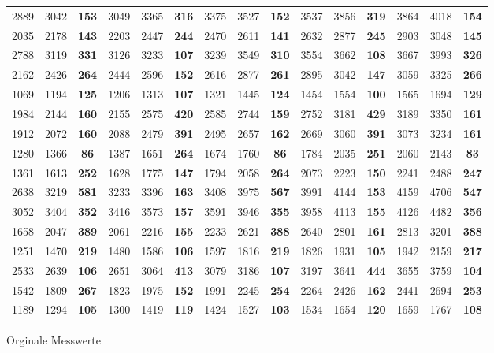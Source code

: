 \documentclass{scrartcl}
\begin{document}
\begin{figure}[H]
{\begin{tabular}{c| c| >{\bfseries}c| c| c| >{\bfseries}c| c| c| >{\bfseries}c| c| c| >{\bfseries}c| c| c| >{\bfseries}c}
                                2889 & 3042 & 153 & 3049 & 3365 & 316 & 3375 & 3527 & 152 & 3537 & 3856 & 319 & 3864 & 4018 & 154\\
                                \rowcolor{lightgray} 2035 & 2178 & 143 & 2203 & 2447 & 244 & 2470 & 2611 & 141 & 2632 & 2877 & 245 & 2903 & 3048 & 145\\
                                2788 & 3119 & 331 & 3126 & 3233 & 107 & 3239 & 3549 & 310 & 3554 & 3662 & 108 & 3667 & 3993 & 326\\
                                \rowcolor{lightgray} 2162 & 2426 & 264 & 2444 & 2596 & 152 & 2616 & 2877 & 261 & 2895 & 3042 & 147 & 3059 & 3325 & 266\\
                                1069 & 1194 & 125 & 1206 & 1313 & 107 & 1321 & 1445 & 124 & 1454 & 1554 & 100 & 1565 & 1694 & 129\\
                                \rowcolor{lightgray} 1984 & 2144 & 160 & 2155 & 2575 & 420 & 2585 & 2744 & 159 & 2752 & 3181 & 429 & 3189 & 3350 & 161\\
                                1912 & 2072 & 160 & 2088 & 2479 & 391 & 2495 & 2657 & 162 & 2669 & 3060 & 391 & 3073 & 3234 & 161\\
                                \rowcolor{lightgray} 1280 & 1366 & 86 & 1387 & 1651 & 264 & 1674 & 1760 & 86 & 1784 & 2035 & 251 & 2060 & 2143 & 83\\
                                1361 & 1613 & 252 & 1628 & 1775 & 147 & 1794 & 2058 & 264 & 2073 & 2223 & 150 & 2241 & 2488 & 247\\
                                \rowcolor{lightgray} 2638 & 3219 & 581 & 3233 & 3396 & 163 & 3408 & 3975 & 567 & 3991 & 4144 & 153 & 4159 & 4706 & 547\\
                                3052 & 3404 & 352 & 3416 & 3573 & 157 & 3591 & 3946 & 355 & 3958 & 4113 & 155 & 4126 & 4482 & 356\\
                                \rowcolor{lightgray} 1658 & 2047 & 389 & 2061 & 2216 & 155 & 2233 & 2621 & 388 & 2640 & 2801 & 161 & 2813 & 3201 & 388\\
                                1251 & 1470 & 219 & 1480 & 1586 & 106 & 1597 & 1816 & 219 & 1826 & 1931 & 105 & 1942 & 2159 & 217\\
                                \rowcolor{lightgray} 2533 & 2639 & 106 & 2651 & 3064 & 413 & 3079 & 3186 & 107 & 3197 & 3641 & 444 & 3655 & 3759 & 104\\
                                1542 & 1809 & 267 & 1823 & 1975 & 152 & 1991 & 2245 & 254 & 2264 & 2426 & 162 & 2441 & 2694 & 253\\
                                \rowcolor{lightgray} 1189 & 1294 & 105 & 1300 & 1419 & 119 & 1424 & 1527 & 103 & 1534 & 1654 & 120 & 1659 & 1767 & 108\\
                           
                            \end{tabular}
                    }
                   \caption{Orginale Messwerte}
                   \label{Measurements}
               \end{figure}
\end{document}
